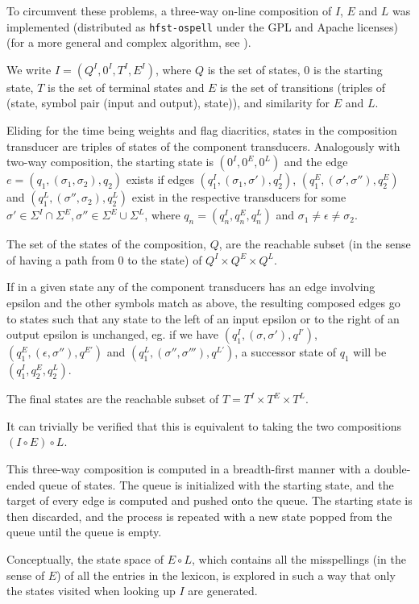 \documentclass{llncs}
\begin{document}
To circumvent these problems, a three-way on-line composition of $I$, $E$ and
$L$ was implemented (distributed as \verb!hfst-ospell!
under the GPL and Apache licenses) (for a more general and complex algorithm,
see \cite{allauzen/2009}).

We write $I = (Q^I, 0^I, T^I, E^I)$, where $Q$
is the set of states, $0$ is the starting state, $T$ is the set of terminal
states and $E$ is the set of transitions (triples of (state, symbol pair
(input and output), state)), and similarity for $E$ and $L$.

Eliding for the time being weights and flag diacritics, states in the
composition transducer are triples of states of the component transducers.
Analogously with two-way composition, the starting state is $(0^I, 0^E, 0^L)$
and the edge $e = (q_1, (\sigma_1, \sigma_2), q_2)$ exists if edges
$(q^I_1, (\sigma_1, \sigma'), q^I_2)$,
$(q^E_1, (\sigma', \sigma''), q^E_2)$ and
$(q^L_1, (\sigma'', \sigma_2), q^L_2)$ exist in the respective transducers
for some
$\sigma' \in \Sigma^I \cap \Sigma^E, \sigma'' \in \Sigma^E \cup \Sigma^L$,
where $q_n = (q^I_n, q^E_n, q^L_n)$ and $\sigma_1 \neq \epsilon \neq \sigma_2$.

The set of the states of the composition, $Q$, are the reachable subset
(in the sense of having a path from $0$ to the state) of
$Q^I \times Q^E \times Q^L$.

If in a given state any of the component transducers has an edge involving
epsilon and the other symbols match as above, the resulting composed edges
go to states such that any state to the left of an input epsilon or to the
right of an output epsilon is unchanged, eg. if we have
$(q^I_1, (\sigma, \sigma'), q^{I'})$, $(q^E_1, (\epsilon, \sigma''), q^{E'})$ and
$(q^L_1, (\sigma'', \sigma'''), q^{L'})$, a successor state of $q_1$ will be
$(q^I_1, q^E_2, q^L_2)$.

The final states are the reachable subset of $T = T^I \times T^E \times T^L$.

It can trivially be verified that this is equivalent to taking the two
compositions $(I \circ E) \circ L$.

This three-way composition is computed in a breadth-first manner with a
double-ended queue of states. The queue is initialized with the starting state,
and the target of every edge is computed and pushed onto the
queue. The starting state is then discarded, and the process is repeated
with a new state popped from the queue until the queue is empty.

Conceptually, the state space of $E \circ L$, which contains all the
misspellings (in the sense of $E$) of all the entries in the lexicon, is
explored in such a way that only the states visited when looking up $I$ are
generated.
\end{document}
